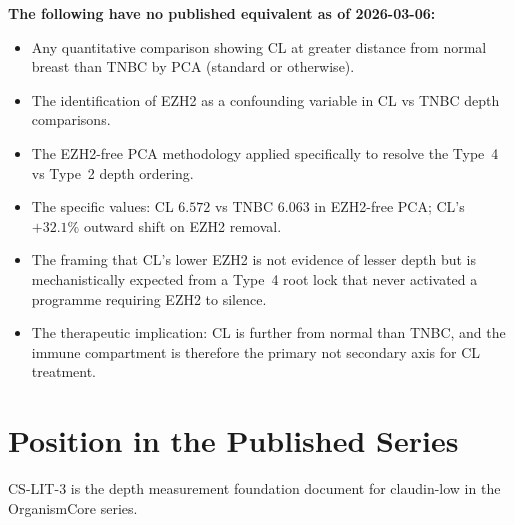 \documentclass[12pt, a4paper]{article}
\begin{document}
\begin{center}
\colorbox{novelbox}{
\begin{minipage}{0.88\textwidth}
\vspace{0.5em}
\textbf{The following have no published equivalent
as of 2026-03-06:}
\begin{itemize}[noitemsep]
    \item Any quantitative comparison showing
    CL at greater distance from normal breast
    than TNBC by PCA (standard or otherwise).
    \item The identification of EZH2 as a
    confounding variable in CL vs TNBC depth
    comparisons.
    \item The EZH2-free PCA methodology applied
    specifically to resolve the Type~4 vs Type~2
    depth ordering.
    \item The specific values: CL $6.572$ vs
    TNBC $6.063$ in EZH2-free PCA; CL's
    $+32.1\%$ outward shift on EZH2 removal.
    \item The framing that CL's lower EZH2 is
    not evidence of lesser depth but is
    mechanistically expected from a Type~4
    root lock that never activated a programme
    requiring EZH2 to silence.
    \item The therapeutic implication: CL is
    further from normal than TNBC, and the
    immune compartment is therefore the primary
    not secondary axis for CL treatment.
\end{itemize}
\vspace{0.5em}
\end{minipage}}
\end{center}

\section{Position in the Published Series}

CS-LIT-3 is the depth measurement foundation
document for claudin-low in the OrganismCore series.
\end{document}
